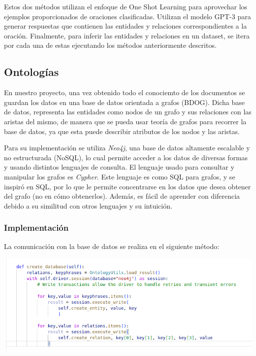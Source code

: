 \documentclass[10pt]{article} %
\begin{document}
	Estos dos métodos utilizan el enfoque de One Shot Learning para aprovechar los ejemplos proporcionados de oraciones clasificadas. Utilizan el modelo GPT-3 para generar respuestas que contienen las entidades y relaciones correspondientes a la oración. Finalmente, para inferir las entidades y relaciones en un dataset, se itera por cada una de estas ejecutando los m\'etodos anteriormente descritos.
	
	\subsection*{Ontolog\'ias}
	
	En nuestro proyecto, una vez obtenido todo el conociemto de los documentos se guardan los datos en una base de datos orientada a grafos (BDOG). Dicha base de datos, representa las entidades como nodos de un grafo y sus relaciones con las aristas del mismo, de manera que se pueda usar teoría de grafos para recorrer la base de datos, ya que esta puede describir atributos de los nodos y las aristas.
	
	Para su implementaci\'on se utiliza \textit{Neo4j},  una base de datos altamente escalable y no estructurada (NoSQL), lo cual permite acceder a los datos de diversas formas y usando distintos lenguajes de consulta. El lenguaje usado para consultar y manipular los grafos es \textit{Cypher}. Este lenguaje es como SQL para grafos, y se inspiró en SQL, por lo que le permite concentrarse en los datos que desea obtener del grafo (no en cómo obtenerlos). Adem\'as, es fácil de aprender con diferencia debido a su similitud con otros lenguajes y su intuición.
	
	\subsubsection{Implementaci\'on}	

    La comunicación con la base de datos se realiza en el siguiente método:
    \begin{center}
    	\includegraphics[scale=0.5]{../images/createdatabase}
    \end{center}
	
\end{document}
